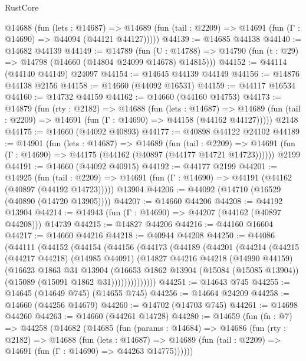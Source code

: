 \begin{lexlean}{RustCore}
\begin{coremodule}
    @14688
      (fun (lets : @14687) =>
      @14689 (fun (tail : @2209) => @14691 (fun (Γ : @14690) => @44094 (@44121 @44127)))))
@44139 := @14685 @44138
@44140 := @14682 @44139
@44149 := @14789
    (fun (U : @14788) => @14790 (fun (t : @29) => @14798 (@14660 (@14804 @24099 @14678) @14815)))
@44152 := @44114 (@44140 @44149) @24097
@44154 := @14645 @44139 @44149
@44156 := @14876 @44138 @2156
@44158 := @14660 (@44092 @16531)
@44159 := @44117 @16534
@44160 := @14732 @44159
@44162 := @14660 (@44160 @14753)
@44173 := @14879
    (fun (rty : @2182) =>
    @14688
      (fun (lets : @14687) =>
      @14689 (fun (tail : @2209) => @14691 (fun (Γ : @14690) => @44158 (@44162 @44127)))))
    @2148
@44175 := @14660 (@44092 @40893)
@44177 := @40898 @44122 @24102
@44189 := @14901
    (fun (lets : @14687) =>
    @14689
      (fun (tail : @2209) =>
      @14691 (fun (Γ : @14690) => @44175 (@44162 (@40897 (@44177 @14721 @14723))))))
    @2199
@44191 := @14660 (@44092 @40915)
@44192 := @44177 @2199
@44201 := @14925
    (fun (tail : @2209) => @14691 (fun (Γ : @14690) => @44191 (@44162 (@40897 (@44192 @14723)))))
    @13904
@44206 := @44092 (@14710 (@16529 (@40890 (@14720 @13905))))
@44207 := @14660 @44206
@44208 := @44192 @13904
@44214 := @14943 (fun (Γ : @14690) => @44207 (@44162 (@40897 @44208))) @14739
@44215 := @14827 @44206
@44216 := @44160 @16604
@44217 := @14660 @44216
@44218 := @40944 @44208
@44250 := @44086
    (@44111
      (@44152
        (@44154
          (@44156
            (@44173
              (@44189
                (@44201
                  (@44214
                    (@44215
                      (@44217 @44218)
                      (@14985 @44091)
                      (@14827
                        @44216
                        @44218
                        (@14990 @44159)
                        (@16623
                          @1863
                          @31
                          @13904
                          (@16653
                            @1862
                            @13904
                            (@15084 (@15085 @13904))
                            (@15089 (@15091 @1862 @31))))))))))))))
@44251 := @14643 @745
@44255 := @14645 (@14649 @745) (@14655 @745)
@44256 := @14664 @24209
@44258 := @14660 (@44256 @14679)
@44260 := @14702 (@14703 @745)
@44261 := @14698 @44260
@44263 := @14660 (@44261 @14728)
@44280 := @14659
    (fun (fn : @7) =>
    @44258
      (@14682
        (@14685
          (fun (params : @14684) =>
          @14686
            (fun (rty : @2182) =>
            @14688
              (fun (lets : @14687) =>
              @14689 (fun (tail : @2209) => @14691 (fun (Γ : @14690) => @44263 @14775))))))

\end{coremodule}
\end{lexlean}
